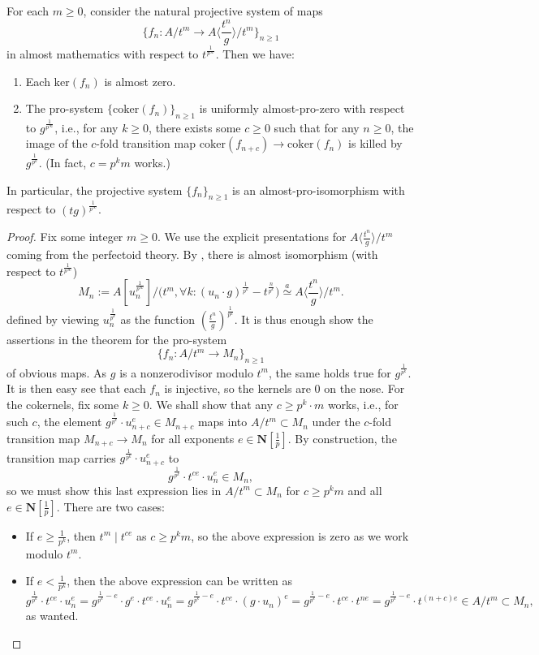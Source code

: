 \documentclass[10pt,reqno]{amsart}
\begin{document}
\begin{theorem}
\label{thm:QuantRET}
For each $m \geq 0$, consider the natural projective system of maps
\[ \{ f_n: A/t^m  \to A \langle \frac{t^n}{g} \rangle/t^m\}_{n \geq 1}\]
in almost mathematics with respect to $t^{\frac{1}{p^\infty}}$. Then we have:
\begin{enumerate}
\item Each $\mathrm{ker}(f_n)$ is almost zero.
\item The pro-system $\{\mathrm{coker}(f_n)\}_{n \geq 1}$ is uniformly almost-pro-zero with respect to $g^{\frac{1}{p^\infty}}$, i.e., for any $k \geq 0$, there exists some $c \geq 0$ such that for any $n \geq 0$, the image of the $c$-fold transition map $\mathrm{coker}(f_{n+c}) \to \mathrm{coker}(f_n)$ is killed by $g^{\frac{1}{p^k}}$. (In fact, $c = p^k m$ works.)
\end{enumerate}
In particular, the projective system $\{f_n\}_{n \geq 1}$ is an almost-pro-isomorphism with respect to $(tg)^{\frac{1}{p^\infty}}$.
\end{theorem}
\begin{proof}
Fix some integer $m \geq 0$. We use the explicit presentations for $A\langle \frac{t^n}{g} \rangle/t^m$ coming from the perfectoid theory. By \cite[Lemma 6.4]{ScholzePerfectoidSpaces}, there is almost isomorphism (with respect to $t^{\frac{1}{p^\infty}}$)
\[ M_n :=  A[u_n^{\frac{1}{p^\infty}}]/\big(t^m, \forall k: (u_n \cdot g)^{\frac{1}{p^k}} - t^{\frac{n}{p^k}}\big)  \stackrel{a}{\simeq} A\langle \frac{t^n}{g} \rangle/t^m.\]
defined by  viewing $u_n^{\frac{1}{p^k}}$ as the function $(\frac{t^n}{g})^{\frac{1}{p^k}}$. It is thus enough show the assertions in the theorem for the pro-system
\[ \{f_n: A/t^m \to M_n\}_{n \geq 1}\]
of obvious maps. As $g$ is a nonzerodivisor modulo $t^m$, the same holds true for $g^{\frac{1}{p^k}}$. It is then easy see that each $f_n$ is injective, so the kernels are $0$ on the nose. For the cokernels, fix some $k \geq 0$. We shall show that any $c \geq p^k \cdot m$ works, i.e., for such $c$, the element $g^{\frac{1}{p^k}} \cdot u_{n+c}^e \in M_{n+c}$ maps into $A/t^m \subset M_n$ under the $c$-fold transition map $M_{n+c} \to M_n$ for all exponents $e \in \mathbf{N}[\frac{1}{p}]$. By construction, the transition map carries $g^{\frac{1}{p^k}} \cdot u_{n+c}^e$ to
\[ g^{\frac{1}{p^k}} \cdot t^{ce} \cdot u_n^e \in M_n,\]
so we must show this last expression lies in $A/t^m \subset M_n$ for $c \geq p^k m$ and all $e \in \mathbf{N}[\frac{1}{p}]$. There are two cases:
\begin{itemize}
\item If $e \geq \frac{1}{p^k}$, then $t^m \mid t^{ce}$ as $c \geq p^k m$, so the above expression is zero as we work modulo $t^m$.
\item If $e < \frac{1}{p^k}$, then the above expression can be written as
\[ g^{\frac{1}{p^k}} \cdot t^{ce} \cdot u_n^e  = g^{\frac{1}{p^k} - e} \cdot g^{e} \cdot t^{ce} \cdot u_n^e = g^{\frac{1}{p^k} - e}  \cdot t^{ce} \cdot (g \cdot u_n)^e = g^{\frac{1}{p^k} - e}  \cdot t^{ce} \cdot t^{ne} = g^{\frac{1}{p^k} -e} \cdot t^{(n+c)e} \in A/t^m \subset M_n,  \] 
as wanted. \qedhere
\end{itemize}
\end{proof}
\end{document}
